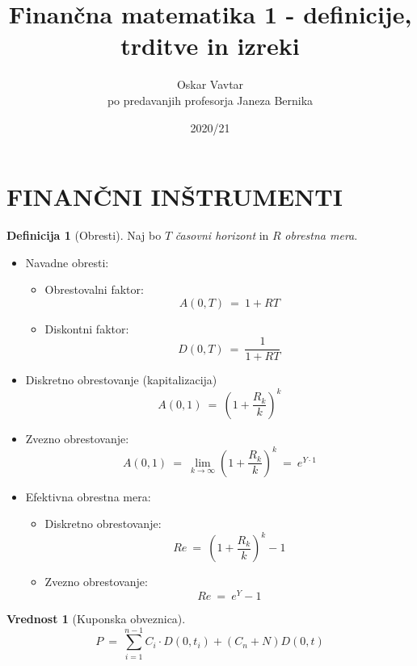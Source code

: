 \documentclass[11pt]{article}
\title{Finančna matematika 1 - definicije, trditve in izreki}
\author{Oskar Vavtar \\
po predavanjih profesorja Janeza Bernika}
\date{2020/21}
\newcommand{\1}{\mathbbm{1}}
\theoremstyle{definition}
\newtheorem{definicija}{Definicija}[section]
\theoremstyle{definition}
\newtheorem{vrednost}{Vrednost}
\begin{document}
\maketitle
\pagebreak
\tableofcontents
\pagebreak


\section{FINANČNI INŠTRUMENTI}
\vspace{0.5cm}

\begin{definicija}[Obresti]

Naj bo $T$ \textit{časovni horizont} in $R$ \textit{obrestna mera}.

\begin{itemize}

	\item Navadne obresti: 
	\begin{itemize}
		\item Obrestovalni faktor:
		$$A(0, T) ~=~ 1 + RT$$
		\item Diskontni faktor:
		$$D(0, T) ~=~ \frac{1}{1 + RT}$$
	\end{itemize}
	
	\item Diskretno obrestovanje (kapitalizacija)
	$$A(0, 1) ~=~ \left( 1 + \frac{R_k}{k} \right)^k$$
	
	\item Zvezno obrestovanje: 
	$$A(0, 1) ~=~ \lim_{k \rightarrow \infty} \left( 1 + \frac{R_k}{k} \right)^k ~=~ e^{Y \cdot 1}$$	
	
	\item Efektivna obrestna mera:
	\begin{itemize}
		\item Diskretno obrestovanje:
		$$Re ~=~ \left( 1 + \frac{R_k}{k} \right)^k - 1$$
		\item Zvezno obrestovanje:
		$$Re ~=~ e^Y - 1$$
	\end{itemize}
	

\end{itemize}

\end{definicija}
\vspace{0.5cm}

\begin{vrednost}[Kuponska obveznica]

$$P ~=~ \sum_{i=1}^{n-1} C_i \cdot D(0, t_i) + (C_n + N) D(0, t)$$

\end{vrednost}
\vspace{0.5cm}
\end{document}
